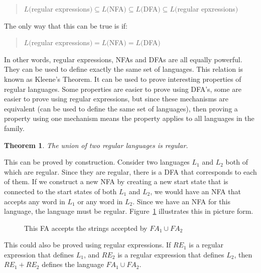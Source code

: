 \documentclass[letterpaper,12pt,openany,reqno]{book}%
\newcommand{\fanonterminalnode}[2] {\node at (#1) (#2) [circle, draw, minimum size=24pt] {#2};}
\newcommand{\fatransition}[3] {\draw [->] (#1) -- (#2) node [midway, above] {#3};}
\newtheorem{theorem}{Theorem}
\begin{document}
\begin{quote}
$L($regular expressions$) \subseteq L($NFA$) \subseteq L($DFA$) \subseteq L($regular epxressions$)$
\end{quote}
The only way that this can be true is if:
\begin{quote}
$L($regular expressions$) = L($NFA$) = L($DFA$)$
\end{quote}
In other words, regular expressions, NFAs and DFAs are all equally powerful. They can be used to define exactly the same set of languages. This relation is known as Kleene's Theorem. It can be used to prove interesting properties of regular languages. Some properties are easier to prove using DFA's, some are easier to prove using regular expressions, but since these mechanisms are equivalent (can be used to define the same set of languages), then proving a property using one mechanism means the property applies to all languages in the family.

\begin{theorem}\label{T.u.of.r.is.r}
The union of two regular languages is regular.
\end{theorem}
This can be proved by construction. Consider two languages $L_1$ and $L_2$ both of which are regular. Since they are regular, there is a DFA that corresponds to each of them. If we construct a new NFA by creating a new start state that is connected to the start states of both $L_1$ and $L_2$, we would have an NFA that accepts any word in $L_1$ or any word in $L_2$. Since we have an NFA for this language, the language must be regular. Figure~\ref{F.union.re} illustrates this in picture form.

\begin{figure}[hbt]
\centering
{}
\caption[Union of to regular expressions]{This FA accepts the strings accepted by $FA_1 \cup FA_2$}
\label{F.union.re}
\end{figure}
This could also be proved using regular expressions. If $RE_1$ is a regular expression that defines $L_1$, and $RE_2$ is a regular expression that defines $L_2$, then $RE_1 + RE_2$ defines the language $FA_1 \cup FA_2$.
\end{document}
